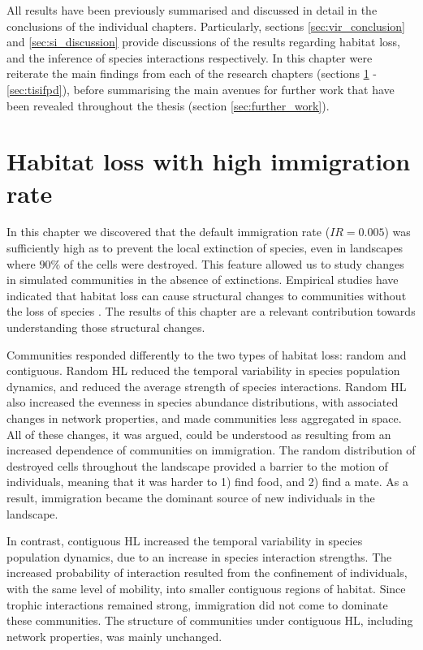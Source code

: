 
All results have been previously summarised and discussed in detail in the conclusions of the individual chapters. Particularly, sections \ref{sec:vir_conclusion} and \ref{sec:si_discussion} provide discussions of the results regarding habitat loss, and the inference of species interactions respectively. In this chapter were reiterate the main findings from each of the research chapters (sections \ref{sec:hl_hi} - \ref{sec:tisifpd}), before summarising the main avenues for further work that have been revealed throughout the thesis (section \ref{sec:further_work}).

\section{Habitat loss with high immigration rate}
\label{sec:hl_hi}

In this chapter we discovered that the default immigration rate ($IR=0.005$) was sufficiently high as to prevent the local extinction of species, even in landscapes where $90\%$ of the cells were destroyed. This feature allowed us to study changes in simulated communities in the absence of extinctions. Empirical studies have indicated that habitat loss can cause structural changes to communities without the loss of species \cite{albrecht2007interaction,tylianakis2007habitat,hagen2012biodiversity}. The results of this chapter are a relevant contribution towards understanding those structural changes.

Communities responded differently to the two types of habitat loss: random and contiguous. Random HL reduced the temporal variability in species population dynamics, and reduced the average strength of species interactions. Random HL also increased the evenness in species abundance distributions, with associated changes in network properties, and made communities less aggregated in space. All of these changes, it was argued, could be understood as resulting from an increased dependence of communities on immigration. The random distribution of destroyed cells throughout the landscape provided a barrier to the motion of individuals, meaning that it was harder to 1) find food, and 2) find a mate. As a result, immigration became the dominant source of new individuals in the landscape.

In contrast, contiguous HL increased the temporal variability in species population dynamics, due to an increase in species interaction strengths. The increased probability of interaction resulted from the confinement of individuals, with the same level of mobility, into smaller contiguous regions of habitat. Since trophic interactions remained strong, immigration did not come to dominate these communities. The structure of communities under contiguous HL, including network properties, was mainly unchanged. 

